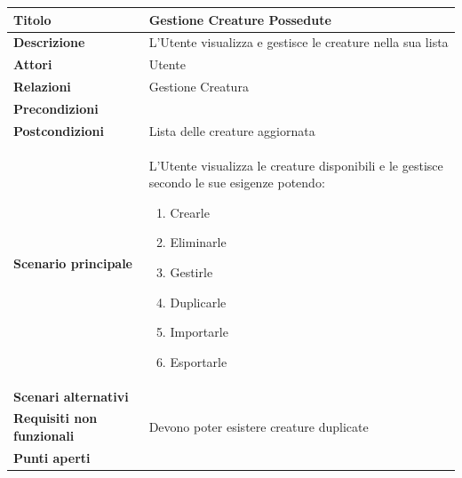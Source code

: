 \documentclass[a4paper, 11pt]{article}
\begin{document}
\begin{center}
\begin{tabular}{ |p{5cm}|p{9.5cm}|  }
\hline
\textbf{Titolo} & Gestione Creature Possedute \\
\hline
\textbf{Descrizione} & L'Utente visualizza e gestisce le creature nella sua lista \\
\hline
\textbf{Attori} & Utente  \\
\hline
\textbf{Relazioni} & Gestione Creatura\\
\hline
\textbf{Precondizioni} &  \\
\hline
\textbf{Postcondizioni} & Lista delle creature aggiornata \\
\hline
\textbf{Scenario principale} & L'Utente visualizza le creature disponibili e le gestisce secondo le sue esigenze potendo:
\begin{enumerate}
    \item Crearle
    \item Eliminarle
    \item Gestirle
    \item Duplicarle
    \item Importarle
    \item Esportarle
\end{enumerate} \\
\hline
\textbf{Scenari alternativi} & \\
\hline
\textbf{Requisiti non funzionali} & Devono poter esistere creature duplicate\\
\hline
\textbf{Punti aperti} & \\
\hline
\end{tabular}

\vspace{3em}


\end{center}
\end{document}
